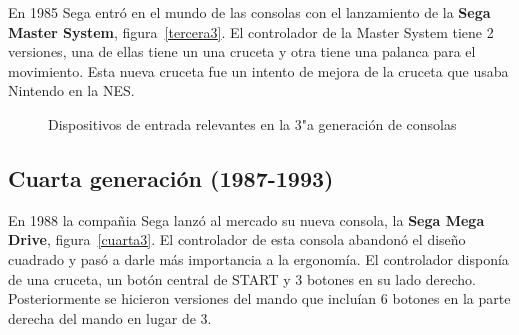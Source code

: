 En 1985 Sega entr\'o en el mundo de las consolas con el lanzamiento de la \textbf{Sega Master System}, figura~\ref{tercera3}. El controlador de la Master System tiene 2 versiones, una de ellas tiene un una cruceta y otra tiene una palanca para el movimiento. Esta nueva cruceta fue un intento de mejora de la cruceta que usaba Nintendo en la NES. 

\begin{figure}[t]
     \hfill
 \hfill
     \caption{Dispositivos de entrada relevantes en la 3"a  generaci\'on de consolas}
     \label{fig:tercera}
   \end{figure}


\subsection{Cuarta generaci\'on (1987-1993)}

En 1988 la compa\~nia Sega lanz\'o al mercado su nueva consola, la \textbf{Sega Mega Drive}, figura~\ref{cuarta3}. El controlador de esta consola abandon\'o el dise\~no cuadrado y pas\'o a darle m\'as importancia a la ergonom\'ia. El controlador dispon\'ia de una cruceta, un bot\'on central de START y 3 botones en su lado derecho. Posteriormente se hicieron versiones del mando que inclu\'ian 6 botones en la parte derecha del mando en lugar de 3.\\


